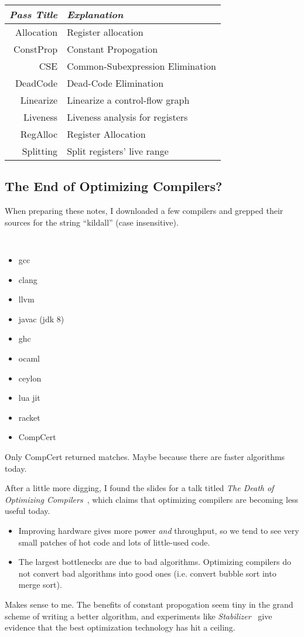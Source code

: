 \documentclass{article}
\begin{document}
\begin{tabular}{r l}
\emph{Pass Title} & \emph{Explanation} \\\hline
 Allocation & Register allocation \\
 ConstProp  & Constant Propogation \\
 CSE        & Common-Subexpression Elimination \\
 DeadCode   & Dead-Code Elimination \\
 Linearize  & Linearize a control-flow graph \\
 Liveness   & Liveness analysis for registers \\
 RegAlloc   & Register Allocation \\
 Splitting  & Split registers' live range \\
\end{tabular}


\subsection*{The End of Optimizing Compilers?}
When preparing these notes, I downloaded a few compilers and grepped their sources for the string ``kildall'' (case insensitive).

\begin{multicols}{3}
{\tt
 \begin{itemize}
 \item[] gcc
 \item[] clang
 \item[] llvm
 \item[] javac (jdk 8)
 \item[] ghc
 \item[] ocaml
 \item[] ceylon
 \item[] lua jit
 \item[] racket
 \item[] CompCert
 \end{itemize}
}
\end{multicols}

Only CompCert returned matches.
Maybe because there are faster algorithms today.

After a little more digging, I found the slides for a talk titled \emph{The Death of Optimizing Compilers}~\cite{death-b}, which claims that optimizing compilers are becoming less useful today.
\begin{itemize}
\item
  Improving hardware gives more power \emph{and} throughput,
   so we tend to see very small patches of hot code and lots of little-used code.
\item
  The largest bottlenecks are due to bad algorithms.
  Optimizing compilers do not convert bad algorithms into good ones
  (i.e. convert bubble sort into merge sort).
\end{itemize}

Makes sense to me.
The benefits of constant propogation seem tiny in the grand scheme of writing a better algorithm, and experiments like \emph{Stabilizer}~\cite{stabilizer-cb} give evidence that the best optimization technology has hit a ceiling.

\vfill{}
\footnotesize


\end{document}
